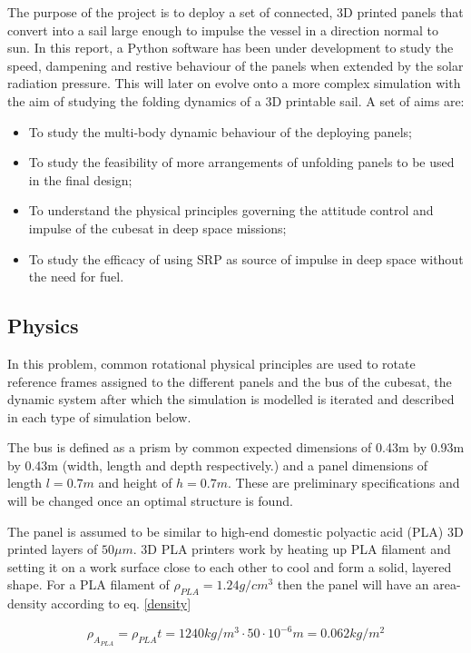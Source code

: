 The purpose of the project
is to deploy a set of connected, 3D printed panels that convert into a sail large enough to impulse the vessel in a direction normal to
sun. In this report, a Python software has been under development to study the speed, dampening and restive behaviour of the panels when extended by the solar radiation pressure. This will later on evolve onto a more complex simulation with the aim of studying the folding dynamics of a 3D printable sail. A set of aims are:

\begin{itemize}
    \item To study the multi-body dynamic behaviour of the deploying panels;
    \item To study the feasibility of more arrangements of unfolding panels to be used in the final design;
    \item To understand the physical principles governing the attitude control and impulse of the cubesat in deep space missions;
    \item To study the efficacy of using SRP as source of impulse in deep space without the need for fuel.
\end{itemize}

\subsection{Physics}

In this problem, common rotational physical principles are used to rotate reference frames assigned to the different panels and the bus of the cubesat, the dynamic system after which the simulation is modelled is iterated and described in each type of simulation below.

The bus is defined as a prism by common expected dimensions of 0.43m by 0.93m by 0.43m (width, length and depth respectively.) and a panel dimensions of length $l=0.7m$ and height of $h=0.7m$. These are preliminary specifications and will be changed once an optimal structure is found.

The panel is assumed to be similar to high-end domestic polyactic acid (PLA) 3D printed layers of $50\mu m$. 3D PLA printers work by heating up PLA filament and setting it on a work surface close to each other to cool and form a solid, layered shape. For a PLA filament of $\rho_{PLA} = 1.24g/cm^3$ \protect\cite{pladensity} then the panel will have an area-density according to eq. \ref{density}

\begin{equation}
\rho_{A_{PLA}} = \rho_{PLA} t = 1240 kg/m^3 \cdot 50 \cdot 10^{-6} m = 0.062 kg/m^2 \label{density}
\end{equation}

